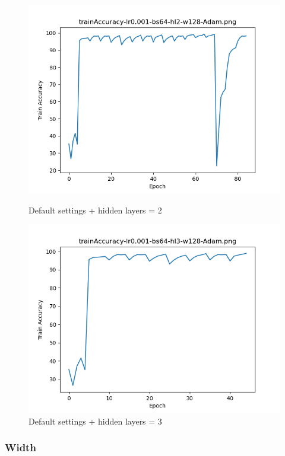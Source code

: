 \documentclass{article}[12pt]
\begin{document}
        \begin{figure}[H]
        \includegraphics[width=\linewidth]{testsResults/trainAccuracy/def.png}
        \caption{Default settings + hidden layers = 2}
        \endminipage
        \includegraphics[width=\linewidth]{testsResults/trainAccuracy/trainAccuracy-lr0.001-bs64-hl3-w128-Adam.png}
        \caption{Default settings + hidden layers = 3}
        \endminipage
    \end{figure}

    \newpage
\subsubsection{Width}
\end{document}
